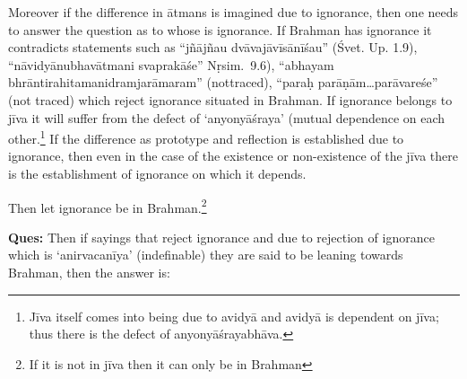 Moreover if the difference in ātmans is imagined due to ignorance, then one needs to answer the question as to whose is ignorance. If Brahman has ignorance it contradicts statements such as “jñājñau dvāvajāvīsānīśau” (Śvet. Up. 1.9), “nāvidyānubhavātmani svaprakāśe” Nṛsim.~9.6), “abhayam bhrāntirahitamanidramjarāmaram” (not\break traced), “paraḥ parāṇām…parāvareśe” (not traced) which reject ignorance situated in Brahman. If ignorance belongs to jīva it will suffer from the defect of ‘anyonyāśraya’ (mutual dependence on each other.\footnote{Jīva itself comes into being due to avidyā and avidyā is dependent on jīva; thus there is the defect of anyonyāśrayabhāva.} If the difference as prototype and reflection is established due to ignorance, then even in the case of the existence or non-existence of the jīva there is the establishment of ignorance on which it depends. 


Then let ignorance be in Brahman.\footnote{If it is not in jīva then it can only be in Brahman} 

\textbf{Ques:} Then if sayings that reject ignorance and due to rejection of ignorance which is ‘anirvacanīya’ (indefinable) they are said to be leaning towards Brahman, then the answer is: 

